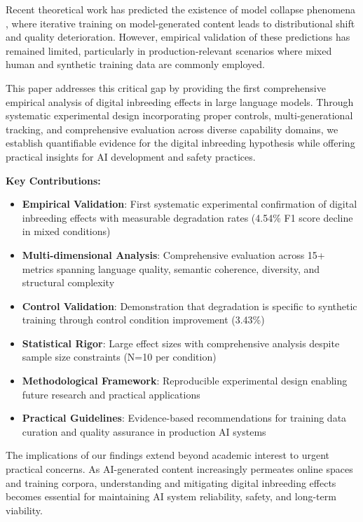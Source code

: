 \documentclass{article}
\begin{document}
Recent theoretical work has predicted the existence of model collapse phenomena \citep{shumailov2023curse}, where iterative training on model-generated content leads to distributional shift and quality deterioration. However, empirical validation of these predictions has remained limited, particularly in production-relevant scenarios where mixed human and synthetic training data are commonly employed.

This paper addresses this critical gap by providing the first comprehensive empirical analysis of digital inbreeding effects in large language models. Through systematic experimental design incorporating proper controls, multi-generational tracking, and comprehensive evaluation across diverse capability domains, we establish quantifiable evidence for the digital inbreeding hypothesis while offering practical insights for AI development and safety practices.

\textbf{Key Contributions:}
\begin{itemize}
    \item \textbf{Empirical Validation}: First systematic experimental confirmation of digital inbreeding effects with measurable degradation rates (4.54\% F1 score decline in mixed conditions)
    \item \textbf{Multi-dimensional Analysis}: Comprehensive evaluation across 15+ metrics spanning language quality, semantic coherence, diversity, and structural complexity
    \item \textbf{Control Validation}: Demonstration that degradation is specific to synthetic training through control condition improvement (3.43\%)
    \item \textbf{Statistical Rigor}: Large effect sizes with comprehensive analysis despite sample size constraints (N=10 per condition)
    \item \textbf{Methodological Framework}: Reproducible experimental design enabling future research and practical applications
    \item \textbf{Practical Guidelines}: Evidence-based recommendations for training data curation and quality assurance in production AI systems
\end{itemize}

The implications of our findings extend beyond academic interest to urgent practical concerns. As AI-generated content increasingly permeates online spaces and training corpora, understanding and mitigating digital inbreeding effects becomes essential for maintaining AI system reliability, safety, and long-term viability.
\end{document}

